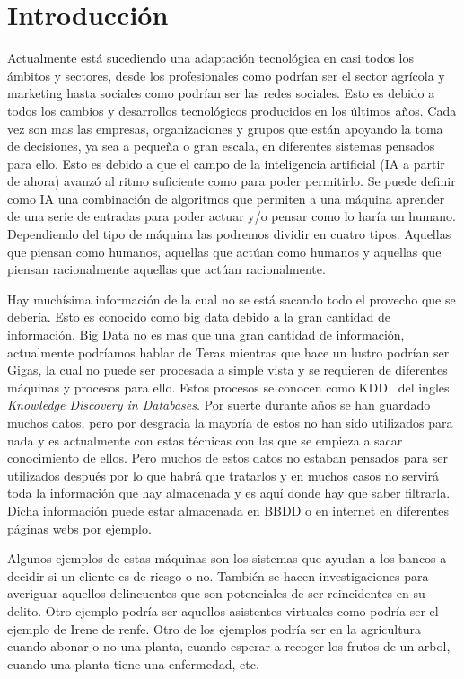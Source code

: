 \documentclass[11pt,a4paper,twoside,final]{article}
\begin{document}
\section{Introducción}
Actualmente está sucediendo una adaptación tecnológica en casi todos los ámbitos y sectores, desde los profesionales como podrían ser
 el sector agrícola y marketing hasta sociales como podrían ser las redes sociales. Esto es debido a todos los cambios y desarrollos
 tecnológicos producidos en los últimos años.
Cada vez son mas las empresas, organizaciones y grupos que están apoyando la toma de decisiones, ya sea a pequeña o gran escala,
en diferentes sistemas pensados para ello. Esto es debido a que el campo de la inteligencia artificial (IA a partir de ahora)
avanzó al ritmo suficiente como para poder permitirlo. Se puede definir como IA una combinación de algoritmos que permiten a
 una máquina aprender de una serie de entradas para poder actuar y/o pensar como lo haría un humano. Dependiendo del tipo de máquina
 las podremos dividir en cuatro tipos. Aquellas que piensan como humanos, aquellas que actúan como humanos y aquellas que piensan racionalmente
 aquellas que actúan racionalmente.

\smallskip
Hay muchísima información de la cual no se está sacando todo el provecho que se debería. Esto es conocido como
 big data debido a la gran cantidad de información. Big Data no es mas que una gran cantidad de información, actualmente podríamos hablar de Teras mientras
 que hace un lustro podrían ser Gigas, la cual no puede ser procesada a simple vista y se requieren de diferentes máquinas y procesos para ello. Estos procesos
 se conocen como KDD~\cite{kdd} del ingles \textit{Knowledge Discovery in Databases}. Por suerte durante años se han guardado muchos datos, pero por desgracia
 la mayoría de estos no han sido utilizados para nada y es actualmente con estas técnicas con las que se empieza a sacar conocimiento de ellos. Pero muchos de estos
 datos no estaban pensados para ser utilizados después por lo que habrá que tratarlos y en muchos casos no servirá toda la información que hay almacenada
 y es aquí donde hay que saber filtrarla. Dicha información puede estar almacenada en BBDD o en internet en diferentes páginas webs por ejemplo.

\smallskip
Algunos ejemplos de estas máquinas son los sistemas que ayudan a los bancos a decidir si un cliente es de riesgo o no. También se hacen investigaciones
 para averiguar aquellos delincuentes que son potenciales de ser reincidentes en su delito. Otro ejemplo podría ser aquellos asistentes virtuales como
 podría ser el ejemplo de Irene de renfe. Otro de los ejemplos podría ser en la agricultura cuando abonar o no una planta, cuando esperar a
 recoger los frutos de un arbol, cuando una planta tiene una enfermedad, etc.
\end{document}
